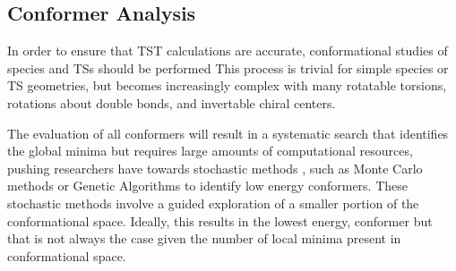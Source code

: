 \documentclass[preprint, 11pt]{elsarticle} %
\begin{document}

\subsection{Conformer Analysis}

In order to ensure that TST calculations are accurate, conformational studies of species and TSs should be performed 
This process is trivial for simple species or TS geometries, but becomes increasingly complex with many rotatable torsions, rotations about double bonds, and invertable chiral centers. 

The evaluation of all conformers will result in a systematic search that identifies the global minima but requires large amounts of computational resources, pushing researchers have towards stochastic methods \cite{Ebejer:2012}, such as Monte Carlo methods or Genetic Algorithms to identify low energy conformers. 
These stochastic methods involve a guided exploration of a smaller portion of the conformational space.
Ideally, this results in the lowest energy, conformer but that is not always the case given the number of local minima present in conformational space.
\end{document}
